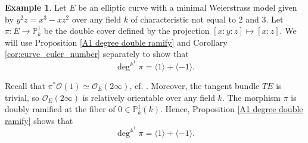 \documentclass[12pt, reqno]{amsart}
\theoremstyle{definition}
\newtheorem{example}[theorem]{Example}
\newcommand{\Proj}{\mathbb{P}} %
\newcommand{\Adeg}{\deg^{\mathbb{A}^1}} %
\newcommand{\Oh}{\mathscr{O}} %
\begin{document}
\begin{example} \label{example:ellipticcurve}
Let $E$ be an elliptic curve with a minimal Weierstrass model given by $y^2z = x^3 - xz^2$ over any field $k$ of characteristic not equal to $2$ and $3$. Let $\pi: E \to \Proj^1_k$ be the double cover defined by the projection $[x:y:z] \mapsto [x:z]$. We will use Proposition \ref{A1 degree double ramify} and Corollary \ref{cor:curve_euler_number} separately to show that
\begin{equation*}
    \Adeg \pi = \langle 1 \rangle + \langle -1 \rangle.
\end{equation*}

Recall that $\pi^* \Oh(1) \simeq \Oh_E(2 \infty)$, cf. \cite[The explanation before Theorem IV.4.1]{hartshorne}. Moreover, the tangent bundle $TE$ is trivial, so $\Oh_E(2\infty)$ is relatively orientable over any field $k$. The morphism $\pi$ is doubly ramified at the fiber of $0 \in \mathbb{P}^1_k(k)$. Hence, Proposition \ref{A1 degree double ramify} shows that
\begin{equation*}   
    \Adeg \pi = \langle 1 \rangle + \langle -1 \rangle.
\end{equation*}


\end{example}
\end{document}
